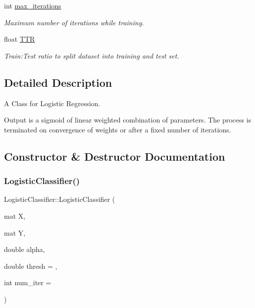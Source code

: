 \begin{DoxyCompactItemize}
\mbox{\label{classLogisticClassifier_a2bd866ae00c99496357eded1f3349419}} 
int \hyperlink{classLogisticClassifier_a2bd866ae00c99496357eded1f3349419}{max\+\_\+iterations}
\begin{DoxyCompactList}\small\item\em Maximum number of iterations while training. \end{DoxyCompactList}\item 
\mbox{\label{classLogisticClassifier_a1102d221b2c6636c05444af54470ffea}} 
float \hyperlink{classLogisticClassifier_a1102d221b2c6636c05444af54470ffea}{T\+TR}
\begin{DoxyCompactList}\small\item\em Train\+:Test ratio to split dataset into training and test set. \end{DoxyCompactList}\end{DoxyCompactItemize}


\subsection{Detailed Description}
A Class for Logistic Regression. 

Output is a sigmoid of linear weighted combination of parameters. The process is terminated on convergence of weights or after a fixed number of iterations. 

\subsection{Constructor \& Destructor Documentation}
\mbox{\label{classLogisticClassifier_ad09081f432b7290fd38f82e2b63331ad}} 
\subsubsection{\texorpdfstring{Logistic\+Classifier()}{LogisticClassifier()}}
{\footnotesize\ttfamily Logistic\+Classifier\+::\+Logistic\+Classifier (\begin{DoxyParamCaption}\item[{mat}]{X,  }\item[{mat}]{Y,  }\item[{double}]{alpha,  }\item[{double}]{thresh = {},  }\item[{int}]{num\+\_\+iter = {} }\end{DoxyParamCaption})}



